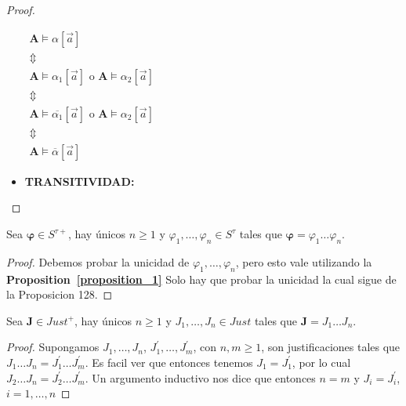 \begin{proof}
\begin{itemize}
      $\displaystyle \begin{array}{c} \mathbf{A}\models \alpha \left\lbrack \vec{a}\right\rbrack \\ \Updownarrow \\ \mathbf{A}\models \alpha _{1}\left\lbrack \vec{a}\right\rbrack \text{ o }\mathbf{A} \models \alpha _{2}\left\lbrack \vec{a}\right\rbrack \\ \Updownarrow \\ \mathbf{A}\models \overline{\alpha _{1}}\left\lbrack \vec{a}\right\rbrack \text{ o } \mathbf{A}\models \alpha _{2}\left\lbrack \vec{a}\right\rbrack \\ \Updownarrow \\ \mathbf{A}\models \overline{\alpha }\left\lbrack \vec{a}\right\rbrack \end{array} $

      \item \textbf{TRANSITIVIDAD:}
    \end{itemize}
  \end{proof}

  \begin{lemma} \label{lemma_68}
    \PN Sea $\pmb{\varphi} \in S^{\tau +}$, hay únicos $n \geq 1$ y $\varphi_{1}, \dotsc, \varphi_{n} \in S^{\tau}$
    tales que $\pmb{\varphi} = \varphi_{1} \dotsc \varphi_{n}$.
  \end{lemma}
  \begin{proof}
    \PN Debemos probar la unicidad de $\varphi_{1}, \dotsc, \varphi_{n}$, pero esto vale utilizando la
    \textbf{Proposition~\ref{proposition_1}} Solo hay que probar la unicidad la cual sigue de la Proposicion 128.
  \end{proof}

  \begin{lemma} \label{lemma_69}
    \PN Sea $\mathbf{J} \in Just^{+}$, hay únicos $n \geq 1$ y $J_{1}, \dotsc, J_{n} \in Just$ tales que $\mathbf{J} =
    J_{1} \dotsc J_{n}$.
  \end{lemma}
  \begin{proof}
    \PN Supongamos $J_{1}, \dotsc, J_{n}$, $J_{1}^{\prime}, \dotsc, J_{m}^{\prime}$, con $ n,m\geq 1$, son
    justificaciones tales que $J_{1}\dotsc J_{n}=J_{1}^{\prime}\dotsc J_{m}^{\prime}$. Es facil ver que entonces tenemos
    $J_{1}=J_{1}^{\prime}$, por lo cual $J_{2}\dotsc J_{n}=J_{2}^{\prime}\dotsc J_{m}^{\prime}$. Un argumento inductivo
    nos dice que entonces $n=m$ y $J_{i}=J_{i}^{\prime}$, $ i=1, \dotsc, n$
  \end{proof}

